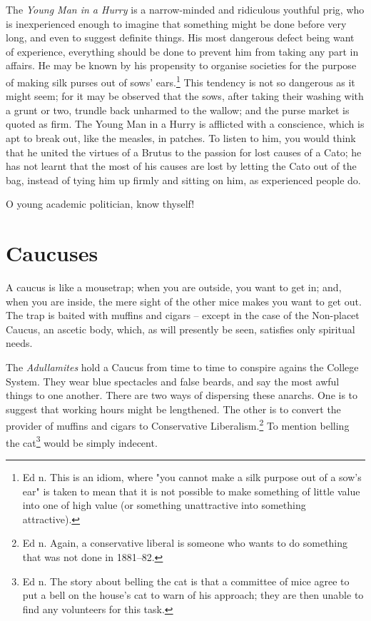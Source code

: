 \documentclass[12pt, oneside, b5paper]{memoir}
\begin{document}
The \textit{Young Man in a Hurry} is a narrow-minded and ridiculous youthful prig, who is inexperienced enough to imagine that something might be done before very long, and even to suggest definite things. His most dangerous defect being want of experience, everything should be done to prevent him from taking any part in affairs. He may be known by his propensity to organise societies for the purpose of making silk purses out of sows' ears.\footnote{Ed n. This is an idiom, where "you cannot make a silk purpose out of a sow's ear" is taken to mean that it is not possible to make something of little value into one of high value (or something unattractive into something attractive).} This tendency is not so dangerous as it might seem; for it may be observed that the sows, after taking their washing with a grunt or two, trundle back unharmed to the wallow; and the purse market is quoted as firm. The Young Man in a Hurry is afflicted with a conscience, which is apt to break out, like the measles, in patches. To listen to him, you would think that he united the virtues of a Brutus to the passion for lost causes of a Cato; he has not learnt that the most of his causes are lost by letting the Cato out of the bag, instead of tying him up firmly and sitting on him, as experienced people do.

O young academic politician, know thyself!

\chapter{Caucuses}

A caucus is like a mousetrap; when you are outside, you want to get in; and, when you are inside, the mere sight of the other mice makes you want to get out. The trap is baited with muffins and cigars -- except in the case of the Non-placet Caucus, an ascetic body, which, as will presently be seen, satisfies only spiritual needs.

The \textit{Adullamites} hold a Caucus from time to time to conspire agains the College System. They wear blue spectacles and false beards, and say the most awful things to one another. There are two ways of dispersing these anarchs. One is to suggest that working hours might be lengthened. The other is to convert the provider of muffins and cigars to Conservative Liberalism.\footnote{Ed n. Again, a conservative liberal is someone who wants to do something that was not done in 1881--82.} To mention belling the cat\footnote{Ed n. The story about belling the cat is that a committee of mice agree to put a bell on the house's cat to warn of his approach; they are then unable to find any volunteers for this task.} would be simply indecent.
\end{document}
